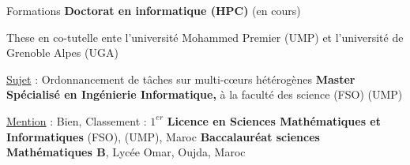 \begin{rubric}{Formations}
    \textbf{Doctorat en informatique (HPC)} (en cours) \par
    These en co-tutelle ente l'université Mohammed Premier (UMP) et l'université de Grenoble Alpes (UGA)
    \par \underline{Sujet} : Ordonnancement de tâches sur multi-cœurs hétérogènes
%
\entry*[$2014$]%
    \textbf{Master Spécialisé en Ingénierie Informatique,} à la faculté des science (FSO) (UMP)\par
    \underline{Mention} : Bien, Classement : $1^{er}$%
%
\entry*[$2012$]%
    \textbf{Licence en Sciences Mathématiques et Informatiques} (FSO), (UMP), Maroc
%
%
\entry*[$2008$]%
    \textbf{Baccalauréat sciences Mathématiques B}, Lycée Omar, Oujda, Maroc
\end{rubric}

